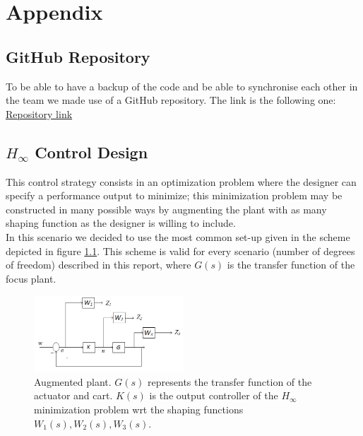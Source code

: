\chapter{Appendix}
\section{GitHub Repository}
To be able to have a backup of the code and be able to synchronise each other in the team we made use of a GitHub repository. The link is the following one: \href{https://github.com/rssalessio/linearVibrationsControl}{Repository link}
\section{$H_\infty$ Control Design} \label{app:hinf}
This control strategy consists in an optimization problem where the designer can specify a performance output to minimize; this minimization problem may be constructed in many possible ways by augmenting the plant with as many shaping function as the designer is willing to include.\\

In this scenario we decided to use the most common set-up given in the scheme depicted in figure \ref{fig:hinfscheme}. This scheme is valid for every scenario (number of degrees of freedom) described in this report, where $G(s)$ is the transfer function of the focus plant.\\

\begin{figure}[h]
	\centering
	\includegraphics[width=0.5\textwidth]{img/hinf_scheme.png}
	\caption{Augmented plant. $G(s)$ represents the transfer function of the actuator and cart. $K(s)$ is the output controller of the $H_\infty$ minimization problem wrt the shaping functions $W_1(s), W_2(s), W_3(s)$.}
	\label{fig:hinfscheme}
\end{figure}

